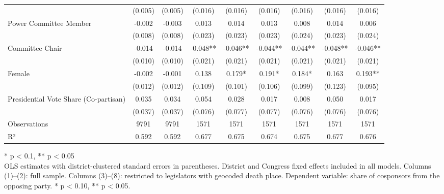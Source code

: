 \begin{table}[t]
\begin{tabular*}{\linewidth}{@{\extracolsep{\fill}}lcccccccc}
 & (0.005) & (0.005) & (0.016) & (0.016) & (0.016) & (0.016) & (0.016) & (0.016) \\ 
Power Committee Member & -0.002 & -0.003 & 0.013 & 0.014 & 0.013 & 0.008 & 0.014 & 0.006 \\ 
 & (0.008) & (0.008) & (0.023) & (0.023) & (0.023) & (0.024) & (0.023) & (0.024) \\ 
Committee Chair & -0.014 & -0.014 & -0.048** & -0.046** & -0.044** & -0.044** & -0.048** & -0.046** \\ 
 & (0.010) & (0.010) & (0.021) & (0.021) & (0.021) & (0.021) & (0.021) & (0.021) \\ 
Female & -0.002 & -0.001 & 0.138 & 0.179* & 0.191* & 0.184* & 0.163 & 0.193** \\ 
 & (0.012) & (0.012) & (0.109) & (0.101) & (0.106) & (0.099) & (0.123) & (0.095) \\ 
Presidential Vote Share (Co-partisan) & 0.035 & 0.034 & 0.054 & 0.028 & 0.017 & 0.008 & 0.050 & 0.017 \\ 
{} & {(0.037)} & {(0.037)} & {(0.076)} & {(0.077)} & {(0.077)} & {(0.076)} & {(0.076)} & {(0.076)} \\ 
Observations & 9791 & 9791 & 1571 & 1571 & 1571 & 1571 & 1571 & 1571 \\ 
R² & 0.592 & 0.592 & 0.677 & 0.675 & 0.674 & 0.675 & 0.677 & 0.676 \\ 
\bottomrule
\end{tabular*}
\begin{minipage}{\linewidth}
\vspace{.05em}
* p < 0.1, ** p < 0.05\\
OLS estimates with district-clustered standard errors in parentheses. District and Congress fixed effects included in all models. Columns (1)–(2): full sample. Columns (3)–(8): restricted to legislators with geocoded death place. Dependent variable: share of cosponsors from the opposing party. * p < 0.10, ** p < 0.05.\\
\end{minipage}
\end{table}

